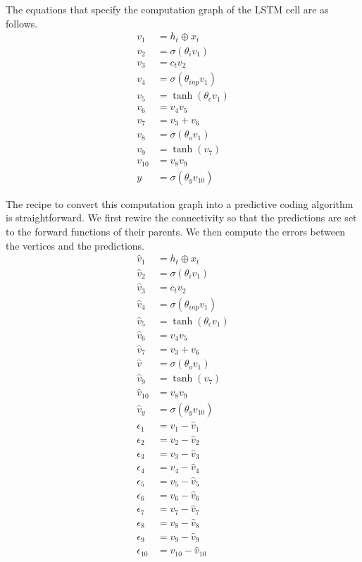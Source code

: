 The equations that specify the computation graph of the LSTM cell are as follows.
\begin{align*}
    v_1 &= h_t \oplus x_t \\
    v_2 &= \sigma(\theta_i v_1) \\ 
    v_3 &= c_t v_2 \\ 
    v_4 &= \sigma (\theta_{inp} v_1) \\ 
    v_5 &= \tanh(\theta_c v_1) \\ 
    v_6 &= v_4 v_5 \\ 
    v_7 &= v_3 + v_6 \\ 
    v_8 &= \sigma (\theta_o v_1)  \\ 
    v_9 &= \tanh(v_7)\\
    v_{10} &= v_8 v_9 \\
    y &= \sigma(\theta_y v_{10})
\end{align*}

The recipe to convert this computation graph into a predictive coding algorithm is straightforward. We first rewire the connectivity so that the predictions are set to the forward functions of their parents. We then compute the errors between the vertices and the predictions. 
\begin{align*}
    \hat{v}_1 &= h_t \oplus x_t \\
    \hat{v}_2 &= \sigma(\theta_i v_1) \\ 
    \hat{v}_3 &= c_t v_2 \\ 
    \hat{v}_4 &= \sigma (\theta_{inp} v_1) \\ 
    \hat{v}_5 &= \tanh(\theta_c v_1) \\ 
    \hat{v}_6 &= v_4 v_5 \\ 
    \hat{v}_7 &= v_3 + v_6 \\ 
    \hat{v} &= \sigma (\theta_o v_1)  \\ 
    \hat{v}_9 &= \tanh(v_7)\\
    \hat{v}_{10} &= v_8 v_9 \\
    \hat{v}_y &= \sigma(\theta_y v_{10}) \\
    \epsilon_1 &= v_1 - \hat{v}_1 \\
    \epsilon_2 &= v_2 - \hat{v}_2 \\
    \epsilon_3 &= v_3 - \hat{v}_3 \\
    \epsilon_4 &= v_4 - \hat{v}_4 \\
    \epsilon_5 &= v_5 - \hat{v}_5 \\
    \epsilon_6 &= v_6 - \hat{v}_6 \\
    \epsilon_7 &= v_7 - \hat{v}_7 \\
    \epsilon_8 &= v_8 - \hat{v}_8 \\
    \epsilon_9 &= v_9 - \hat{v}_9 \\
    \epsilon_{10} &= v_{10} - \hat{v}_{10}
\end{align*}

